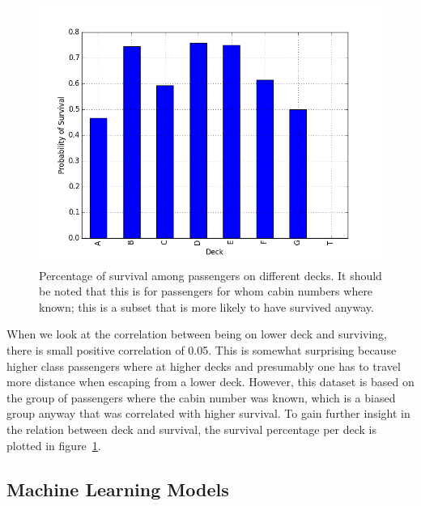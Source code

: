 \documentclass{llncs}
\begin{document}
\begin{figure}[H]
    \centering
    \includegraphics[width=0.4\linewidth]{survival_per_deck}
    \caption{Percentage of survival among passengers on different decks. It should be noted that this is for passengers for whom cabin numbers where known; this is a subset that is more likely to have survived anyway.}
    \label{fig:survival_per_deck}
\end{figure}
\noindent
When we look at the correlation between being on lower deck and surviving, there is small positive correlation of 0.05. This is somewhat surprising because higher class passengers where at higher decks and presumably one has to travel more distance when escaping from a lower deck. However, this dataset is based on the group of passengers where the cabin number was known, which is a biased group anyway that was correlated with higher survival. To gain further insight in the relation between deck and survival, the survival percentage per deck is plotted in figure~\ref{fig:survival_per_deck}.

\subsection{Machine Learning Models}
\label{subsec:titanic_machine_learning_models}
\end{document}
